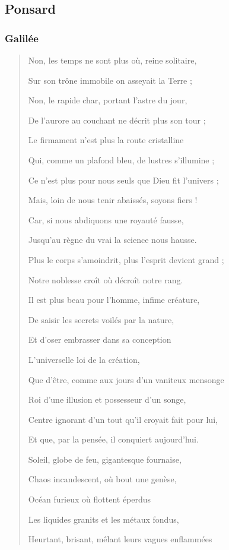 \documentclass[a4paper, 11pt, oneside]{article}
\begin{document}
\subsection{Ponsard}
\subsubsection{Galilée}
\begin{quotation}
Non, les temps ne sont plus où, reine solitaire,

Sur son trône immobile on asseyait la Terre ;

Non, le rapide char, portant l'astre du jour,

De l'aurore au couchant ne décrit plus son tour ;

Le firmament n'est plus la route cristalline

Qui, comme un plafond bleu, de lustres s'illumine ;

Ce n'est plus pour nous seuls que Dieu fit l'univers ;

Mais, loin de nous tenir abaissés, soyons fiers !

Car, si nous abdiquons une royauté fausse,

Jusqu'au règne du vrai la science nous hausse.

Plus le corps s'amoindrit, plus l'esprit devient grand ;

Notre noblesse croît où décroît notre rang.

Il est plus beau pour l'homme, infime créature,

De saisir les secrets voilés par la nature,

Et d'oser embrasser dans sa conception

L'universelle loi de la création,

Que d'être, comme aux jours d'un vaniteux mensonge

Roi d'une illusion et possesseur d'un songe,

Centre ignorant d'un tout qu'il croyait fait pour lui,

Et que, par la pensée, il conquiert aujourd'hui.

\bigskip

Soleil, globe de feu, gigantesque fournaise,

Chaos incandescent, où bout une genèse,

Océan furieux où flottent éperdus

Les liquides granits et les métaux fondus,

Heurtant, brisant, mêlant leurs vagues enflammées


\end{quotation}
\end{document}
